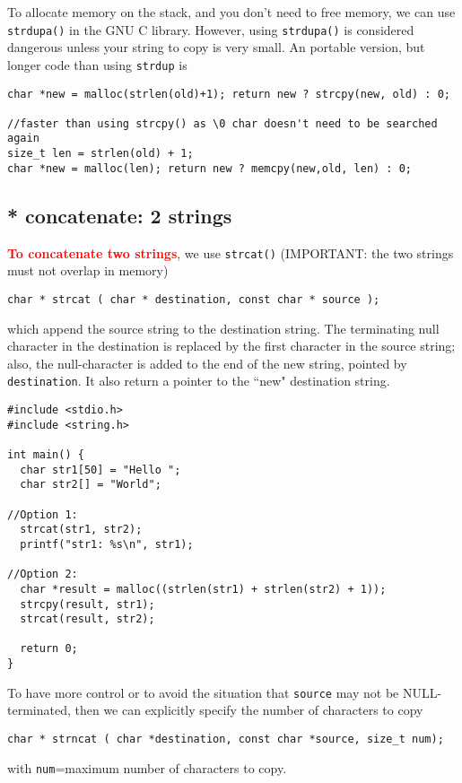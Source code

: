 To allocate memory on the stack, and you don't need to free memory, we can use
\verb!strdupa()! in the GNU C library. However, using \verb!strdupa()! is
considered dangerous unless your string to copy is very small. An portable
version, but longer code than using \verb!strdup! is
\begin{verbatim}
char *new = malloc(strlen(old)+1); return new ? strcpy(new, old) : 0;

//faster than using strcpy() as \0 char doesn't need to be searched again
size_t len = strlen(old) + 1; 
char *new = malloc(len); return new ? memcpy(new,old, len) : 0;
\end{verbatim}


\subsection{* concatenate: 2 strings}

\textcolor{red}{\bf To concatenate two strings}, we use \verb!strcat()!
(IMPORTANT: the two strings must not overlap in memory)
\begin{verbatim}
char * strcat ( char * destination, const char * source );
\end{verbatim}
which append the source string to the destination string. The terminating null
character in the destination is replaced by the first character in the source
string; also, the null-character is added to the end of the new string, pointed
by \verb!destination!. It also return a pointer to the ``new" destination
string. 


{\small \begin{verbatim} 
#include <stdio.h>
#include <string.h>

int main() {
  char str1[50] = "Hello ";
  char str2[] = "World";

//Option 1:
  strcat(str1, str2);
  printf("str1: %s\n", str1);

//Option 2:
  char *result = malloc((strlen(str1) + strlen(str2) + 1));
  strcpy(result, str1);
  strcat(result, str2);

  return 0;
}
\end{verbatim}}

To have more control or to avoid the situation that \verb!source! may not be
NULL-terminated, then we can explicitly specify the number of characters to copy
\begin{verbatim}
char * strncat ( char *destination, const char *source, size_t num);
\end{verbatim}
with \verb!num!=maximum number of characters to copy.

